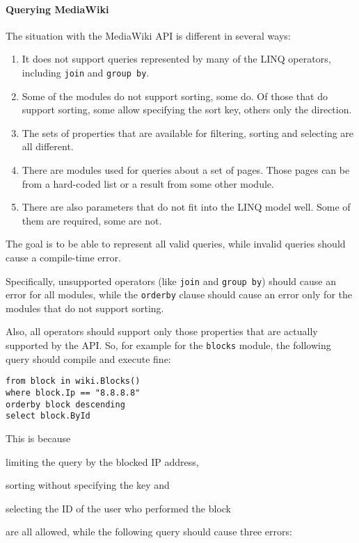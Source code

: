 \paragraph{Querying MediaWiki}

The situation with the MediaWiki \ac{API} is different in several ways:

\begin{enumerate}
\item It does not support queries represented by many of the LINQ operators, including \lstinline{join} and \lstinline{group by}.
\item Some of the modules do not support sorting, some do. Of those that do support sorting, some allow specifying the sort key, others only the direction.
\item The sets of properties that are available for filtering, sorting and selecting are all different.
\item There are modules used for queries about a set of pages. Those pages can be from a hard-coded list or a result from some other module.
\item There are also parameters that do not fit into the LINQ model well. Some of them are required, some are not.
\end{enumerate}

The goal is to be able to represent all valid queries, while invalid queries should cause a compile-time error.

Specifically, unsupported operators (like \lstinline{join} and \lstinline{group by}) should cause an error for all modules,
while the \lstinline{orderby} clause should cause an error only for the modules that do not support sorting.

Also, all operators should support only those properties that are actually supported by the \ac{API}.
So, for example for the \texttt{blocks} module, the following query should compile and execute fine:

\begin{lstlisting}
from block in wiki.Blocks()
where block.Ip == "8.8.8.8"
orderby block descending
select block.ById
\end{lstlisting}

This is because
\begin{compactitem}
\item limiting the query by the blocked \ac{IP} address,
\item sorting without specifying the key and
\item selecting the ID of the user who performed the block
\end{compactitem}
are all allowed, while the following query should cause three errors:

